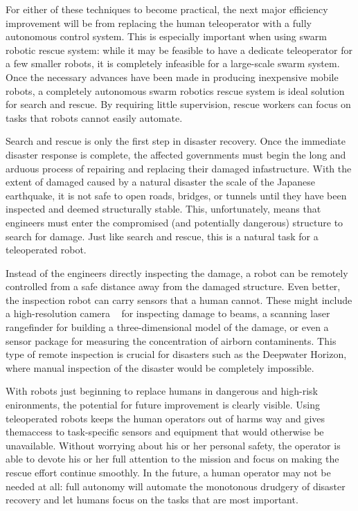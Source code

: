 \documentclass[twocolumn,11pt]{article}
\begin{document}
For either of these techniques to become practical, the next major efficiency
improvement will be from replacing the human teleoperator with a fully
autonomous control system. This is especially important when using swarm
robotic rescue system: while it may be feasible to have a dedicate teleoperator
for a few smaller robots, it is completely infeasible for a large-scale swarm
system. Once the necessary advances have been made in producing inexpensive
mobile robots, a completely autonomous swarm robotics rescue system is ideal
solution for search and rescue. By requiring little supervision, rescue workers
can focus on tasks that robots cannot easily automate.

Search and rescue is only the first step in disaster recovery. Once the
immediate disaster response is complete, the affected governments must begin
the long and arduous process of repairing and replacing their damaged
infastructure. With the extent of damaged caused by a natural disaster the
scale of the Japanese earthquake, it is not safe to open roads, bridges, or
tunnels until they have been inspected and deemed structurally stable. This,
unfortunately, means that engineers must enter the compromised (and potentially
dangerous) structure to search for damage. Just like search and rescue, this is
a natural task for a teleoperated robot.

Instead of the engineers directly inspecting the damage, a robot can be
remotely controlled from a safe distance away from the damaged structure. Even
better, the inspection robot can carry sensors that a human cannot. These might
include a high-resolution camera ~\cite{gym} for inspecting damage to beams, a
scanning laser rangefinder for building a three-dimensional model of the
damage, or even a sensor package for measuring the concentration of airborn
contaminents. This type of remote inspection is crucial for disasters such as
the Deepwater Horizon, where manual inspection of the disaster would be
completely impossible.

With robots just beginning to replace humans in dangerous and high-risk
enironments, the potential for future improvement is clearly visible. Using
teleoperated robots keeps the human operators out of harms way and gives
themaccess to task-specific sensors and equipment that would otherwise be
unavailable. Without worrying about his or her personal safety, the operator is
able to devote his or her full attention to the mission and focus on making the
rescue effort continue smoothly. In the future, a human operator may not be
needed at all: full autonomy will automate the monotonous drudgery of disaster
recovery and let humans focus on the tasks that are most important.
\end{document}
